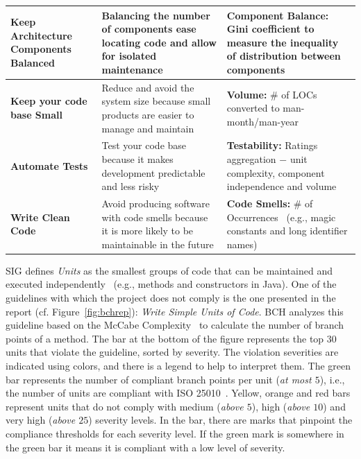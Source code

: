 \documentclass[sigconf,review]{acmart}
\begin{document}
\begin{table}[h]
\begin{tabular}{L{1.66cm}L{3.25cm}L{2.65cm}}
\textbf{Keep Architecture Components Balanced} & Balancing the number of
components ease locating code and allow for isolated maintenance & \textbf{Component Balance:} 
Gini coefficient to measure the inequality of distribution between components~\cite{criteria:2017} \\\midrule

\textbf{Keep your code base Small} & Reduce and avoid the system size because
small products are easier to manage and maintain & \textbf{Volume:} \# of LOCs converted 
to man-month/man-year~\cite{criteria:2017} \\\midrule

\textbf{Automate Tests} & Test your code base because it makes development
predictable and less risky & \textbf{Testability:} Ratings aggregation $-$ unit 
complexity, component independence and volume~\cite{Visser:2016:OREILLY}
 \\\midrule

\textbf{Write Clean Code} & Avoid producing software with code smells because
it is more likely to be maintainable in the future & \textbf{Code Smells:} 
\# of Occurrences~\cite{Visser:2016:OREILLY} (e.g., magic constants and long 
identifier names) \\
\bottomrule
\end{tabular}
\vspace{-0.5cm}
\label{tab:guidelines}
\end{table}


SIG defines \emph{Units} as the smallest groups of code that can be maintained
and executed independently~\cite{Visser:2016:OREILLY} (e.g., methods and
constructors in Java). One of the guidelines with which the project does not
comply is the one presented in the report (cf. Figure~\ref{fig:bchrep}):
\emph{Write Simple Units of Code}. BCH analyzes this guideline based on the
McCabe Complexity~\cite{1702388} to calculate the number of branch points of a
method. The bar at the bottom of the figure represents the top $30$ units that
violate the guideline, sorted by severity. The violation severities are
indicated using colors, and there is a legend to help to interpret them. The
green bar represents the number of compliant branch points per unit (\emph{at
most $5$}), i.e., the number of units are compliant with ISO
25010~\cite{iso:2011}. Yellow, orange and red bars represent units that do not
comply with medium (\emph{above $5$}), high (\emph{above $10$}) and very high
(\emph{above $25$}) severity levels. In the bar, there are marks that pinpoint
the compliance thresholds for each severity level. If the green mark is
somewhere in the green bar it means it is compliant with a low level of
severity.
\end{document}
